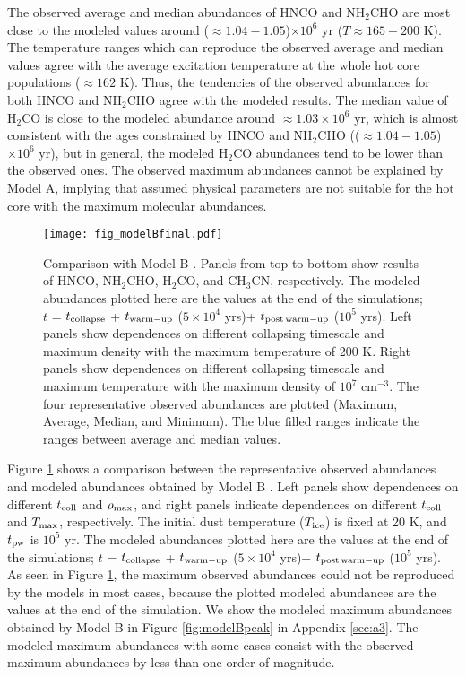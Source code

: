 \documentclass[twocolumn, twocolappendix]{aastex631}
\begin{document}
The observed average and median abundances of HNCO and NH$_{2}$CHO are most close to the modeled values around ($\approx1.04-1.05$)$\times10^{6}$ yr ($T\approx165-200$ K).
The temperature ranges which can reproduce the observed average and median values agree with the average excitation temperature at the whole hot core populations ($\approx162$ K).
Thus, the tendencies of the observed abundances for both HNCO and NH$_{2}$CHO agree with the modeled results.
The median value of H$_{2}$CO is close to the modeled abundance around $\approx1.03\times10^{6}$ yr, which is almost consistent with the ages constrained by HNCO and NH$_{2}$CHO (($\approx1.04-1.05$)$\times10^{6}$ yr), but in general, the modeled H$_{2}$CO abundances tend to be lower than the observed ones.
The observed maximum abundances cannot be explained by Model A, implying that assumed physical parameters are not suitable for the hot core with the maximum molecular abundances. 


\begin{figure*}[!th]
 \begin{center}
  \texttt{[image: fig\_modelBfinal.pdf]}
 \end{center}
\caption{Comparison with Model B \citep{2020ApJ...895...86G}. Panels from top to bottom show results of HNCO, NH$_{2}$CHO, H$_{2}$CO, and CH$_{3}$CN, respectively. The modeled abundances plotted here are the values at the end of the simulations; $t$ = $t_{\rm {collapse}}$ + $t_{\rm {warm-up}}$ ($5\times10^4$ yrs)+ $t_{\rm {post\,warm-up}}$ ($10^5$ yrs). Left panels show dependences on different collapsing timescale and maximum density with the maximum temperature of 200 K. Right panels show dependences on different collapsing timescale and maximum temperature with the maximum density of $10^7$ cm$^{-3}$. The four representative observed abundances are plotted (Maximum, Average, Median, and Minimum). The blue filled ranges indicate the ranges between average and median values. \label{fig:modelB}}
\end{figure*}

Figure \ref{fig:modelB} shows a comparison between the representative observed abundances and modeled abundances obtained by Model B \citep{2020ApJ...895...86G}.
Left panels show dependences on different $t_{\rm {coll}}$ and $\rho_{\rm {max}}$, and right panels indicate dependences on different $t_{\rm {coll}}$ and $T_{\rm {max}}$, respectively.
The initial dust temperature ($T_{\rm {ice}}$) is fixed at 20 K, and $t_{\rm {pw}}$ is $10^{5}$ yr.
The modeled abundances plotted here are the values at the end of the simulations; $t$ = $t_{\rm {collapse}}$ + $t_{\rm {warm-up}}$ ($5\times10^4$ yrs)+ $t_{\rm {post\,warm-up}}$ ($10^5$ yrs).
As seen in Figure \ref{fig:modelB}, the maximum observed abundances could not be reproduced by the models in most cases, because the plotted modeled abundances are the values at the end of the simulation.
We show the modeled maximum abundances obtained by Model B in Figure \ref{fig:modelBpeak} in Appendix \ref{sec:a3}.
The modeled maximum abundances with some cases consist with the observed maximum abundances by less than one order of magnitude.
\end{document}
